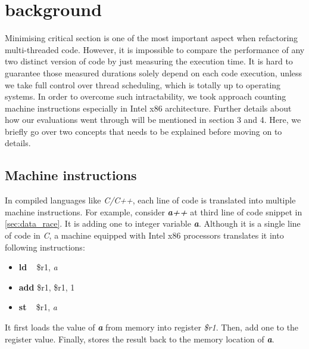 \section{background}

Minimising critical section is one of the most important aspect when refactoring multi-threaded code. However, it is impossible to compare the performance of any two distinct version of code by just measuring the execution time. It is hard to guarantee those measured durations solely depend on each code execution, unless we take full control over thread scheduling, which is totally up to operating systems. In order to overcome such intractability, we took approach counting machine instructions especially in Intel x86 architecture. Further details about how our evaluations went through will be mentioned in section 3 and 4. Here, we briefly go over two concepts that needs to be explained before moving on to details.



\subsection{Machine instructions}
In compiled languages like \textit{C/C++}, each line of code is translated into multiple machine instructions. For example, consider \textbf{\textit{a++}} at third line of code snippet in \ref{sec:data_race}. It is adding one to integer variable \textbf{\textit{a}}. Although it is a single line of code in \textit{C}, a machine equipped with Intel x86 processors translates it into following instructions:
\begin{itemize}
	\item[] \textbf{ld} \,\,\, \$r1, \textit{a}
	\item[] \textbf{add} \$r1, \$r1, 1
	\item[] \textbf{st} \,\,\, \$r1, \textit{a}
\end{itemize}

It first loads the value of \textbf{\textit{a}} from memory into register \textit{\$r1}. Then, add one to the register value. Finally, stores the result back to the memory location of \textbf{\textit{a}}. 